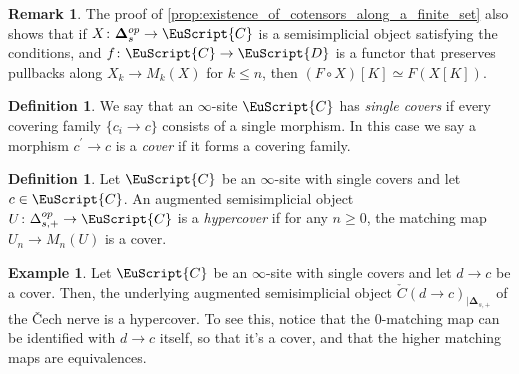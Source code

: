 \documentclass[oneside,a4paper]{amsart}
\newcommand{\euscr}[1]{\EuScript{#1}} %
\newcommand{\ccat}{\euscr{C}} %
\newcommand{\dcat}{\euscr{D}} %
\newcommand{\thickdelta}{\mathbf{\Delta}} %
\theoremstyle{plain}
\theoremstyle{definition}
\newtheorem{example}[thm]{Example}
\newtheorem{defin}[thm]{Definition}
\newtheorem{rem}[thm]{Remark}
\theoremstyle{remark}
\begin{document}
\begin{rem}
\label{rem:formation_of_matching_objects_commutes_with_some_functors}
The proof of \cref{prop:existence_of_cotensors_along_a_finite_set} also shows that if $X \colon \thickdelta_{s}^{op} \rightarrow \ccat$ is a semisimplicial object satisfying the conditions, and $f \colon \ccat \rightarrow \dcat$ is a functor that preserves pullbacks along $X_{k} \rightarrow M_{k}(X)$ for $k \leq n$, then $(F \circ X)[K] \simeq F(X[K])$. 
\end{rem}

\begin{defin}
\label{defin:grothendieck_pretopology_with_single_covers}
We say that an $\infty$-site $\ccat$ has \emph{single covers} if every covering family $\{ c_{i} \rightarrow c \}$ consists of a single morphism. In this case we say a morphism $c^{\prime} \rightarrow c$ is a \emph{cover} if it forms a covering family. 
\end{defin}

\begin{defin}
Let $\ccat$ be an $\infty$-site with single covers and let $c \in \ccat$. An augmented semisimplicial object $U \colon \Delta_{s, +}^{op} \rightarrow \ccat$ is a \emph{hypercover} if for any $n \geq 0$, the matching map $U_{n} \rightarrow M_{n}(U)$ is a cover. 
\end{defin}

\begin{example}
\label{example:covers_are_hypercovers}
Let $\ccat$ be an $\infty$-site with single covers and let $d \rightarrow c$ be a cover. Then, the underlying augmented semisimplicial object $\check{C}(d \rightarrow c) _{| \thickdelta_{s, +}}$ of the \v{C}ech nerve is a hypercover. To see this, notice that the $0$-matching map can be identified with $d \rightarrow c$ itself, so that it's a cover, and that the higher matching maps are equivalences. 
\end{example}
\end{document}
